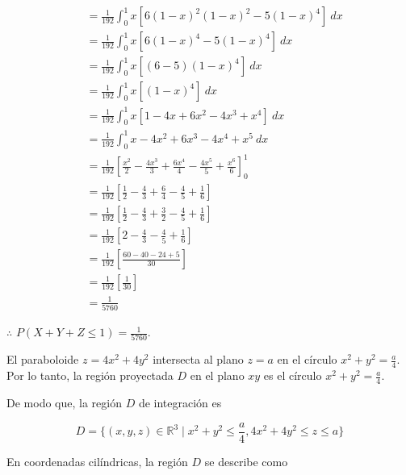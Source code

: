\documentclass[12pt]{exam}
\begin{document}
\begin{questions}
\begin{enumerate}[(a)]
\begin{align*}
      &= \frac{1}{192} \int_0^1 x \left[ 6(1-x)^2(1-x)^2 - 5(1-x)^4 \right] ~ dx \\
      &= \frac{1}{192} \int_0^1 x \left[ 6(1-x)^4 - 5(1-x)^4 \right] ~ dx \\
      &= \frac{1}{192} \int_0^1 x \left[ (6-5)(1-x)^4 \right] ~ dx \\
      &= \frac{1}{192} \int_0^1 x \left[ (1-x)^4 \right] ~ dx \\
      &= \frac{1}{192} \int_0^1 x \left[ 1-4x+6x^2-4x^3+x^4 \right] ~ dx \\
      &= \frac{1}{192} \int_0^1 x -4x^2 + 6x^3 - 4x^4 + x^5 ~ dx \\
      &= \frac{1}{192} \left[ \frac{x^2}{2} - \frac{4x^3}{3} + \frac{6x^4}{4} - \frac{4x^5}{5} + \frac{x^6}{6} \right]_0^1 \\
      &= \frac{1}{192} \left[ \frac{1}{2} - \frac{4}{3} + \frac{6}{4} - \frac{4}{5} + \frac{1}{6} \right] \\
      &= \frac{1}{192} \left[ \frac{1}{2} - \frac{4}{3} + \frac{3}{2} - \frac{4}{5} + \frac{1}{6} \right] \\
      &= \frac{1}{192} \left[ 2 - \frac{4}{3} - \frac{4}{5} + \frac{1}{6} \right] \\
      &= \frac{1}{192} \left[ \frac{60-40-24+5}{30} \right] \\
      &= \frac{1}{192} \left[ \frac{1}{30} \right] \\
      &= \frac{1}{5760}
    \end{align*}

    $\therefore$ $P (X + Y + Z \leq 1) = \frac{1}{5760}$.

  \end{enumerate}


  El paraboloide $z=4x^2+4y^2$ intersecta al plano $z=a$ en el círculo $x^2+y^2=\frac{a}{4}$. Por lo tanto, la región proyectada $D$ en el plano $xy$ es el círculo $x^2+y^2=\frac{a}{4}$.

  De modo que, la región $D$ de integración es 

  \[
  D = \{ (x,y,z) \in \mathbb{R}^3 \mid x^2+y^2 \leq \frac{a}{4}, 4x^2+4y^2 \leq z \leq a \}
  \]

  En coordenadas cilíndricas, la región $D$ se describe como


\end{questions}
\end{document}
